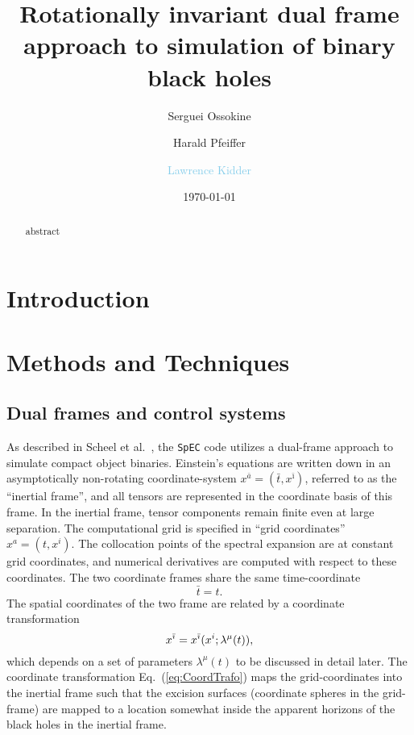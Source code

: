 \documentclass[aps, prd, amsmath, floats, floatfix, twocolumn,superscriptaddress, nofootinbib, showpacs]{revtex4-1}
\theoremstyle{plain}
\theoremstyle{definition}
\newcommand{\Cornell}{\address{Center for Radiophysics and Space
    Research, Cornell University, Ithaca, New York, 14853}}
\newcommand{\CITA}{\address{Canadian Institute for Theoretical Astrophysics,
    University~of~Toronto, Toronto, Ontario M5S 3H8, Canada}}
\newcommand{\sergei}[1]{\textcolor{RubineRed}{#1}}
\newcommand{\harald}[1]{\textcolor{OliveGreen}{#1}}
\newcommand{\larry}[1]{\textcolor{SkyBlue}{#1}}
\begin{document}
\title[Rotationally invariant dual frame approach to simulation of binary 
black holes]{Rotationally invariant dual frame approach to simulation of 
binary black holes}

\author{\sergei{Serguei Ossokine}}\CITA
\author{\harald{Harald Pfeiffer}} \CITA
\author{\larry{Lawrence Kidder}} \Cornell

\begin{abstract}
abstract
\end{abstract}

\date{\today}


\maketitle


\section{Introduction}
\label{sec:intro}



\section{Methods and Techniques}
\label{sec:methods}
\subsection{Dual frames and control systems}


As described in Scheel et al.~\cite{Scheel2006}, the {\tt SpEC} code
utilizes a dual-frame approach to simulate compact object binaries.
Einstein's equations are written down in an asymptotically
non-rotating coordinate-system $x^{\bar a}=(\bar t, x^{\bar\imath})$,
referred to as the ``inertial frame'', and all tensors are represented
in the coordinate basis of this frame.  In the inertial frame, tensor
components remain finite even at large separation.  The computational
grid is specified in ``grid coordinates'' $x^a=(t,x^i)$.  The
collocation points of the spectral expansion are at constant grid
coordinates, and numerical derivatives are computed with respect to
these coordinates.  The two coordinate frames share the same
time-coordinate
\begin{equation}
\bar t=t.
\end{equation}
The spatial coordinates of the two frame are related by a coordinate
transformation
\begin{equation}\label{eq:CoordTrafo}
  x^{\bar\imath}=x^{\bar \imath}\large(x^i; \lambda^\mu(t)\large),
\end{equation}
which depends on a set of parameters $\lambda^\mu(t)$ to be discussed
in detail later.  The coordinate
transformation Eq.~(\ref{eq:CoordTrafo}) maps the grid-coordinates
into the inertial frame such that the excision surfaces (coordinate
spheres in the grid-frame) are mapped to a location somewhat inside
the apparent horizons of the black holes in the inertial frame.
\end{document}
